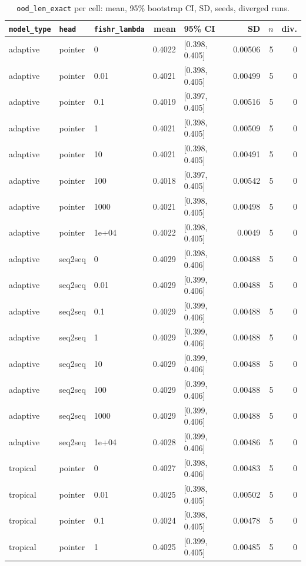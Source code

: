 \documentclass[10pt]{article}
\begin{document}
{\small
\begin{longtable}{lllrlrrr}
\caption{\texttt{ood\_len\_exact} per cell: mean, 95\% bootstrap CI, SD, seeds, diverged runs.}\label{tab:summary-ood_len_exact}\\
\toprule
\texttt{model\_type} & \texttt{head} & \texttt{fishr\_lambda} & mean & 95\% CI & SD & $n$ & div.\\
\midrule
\endhead
adaptive & pointer & 0 & 0.4022 & [0.398, 0.405] & 0.00506 & 5 & 0\\
adaptive & pointer & 0.01 & 0.4021 & [0.398, 0.405] & 0.00499 & 5 & 0\\
adaptive & pointer & 0.1 & 0.4019 & [0.397, 0.405] & 0.00516 & 5 & 0\\
adaptive & pointer & 1 & 0.4021 & [0.398, 0.405] & 0.00509 & 5 & 0\\
adaptive & pointer & 10 & 0.4021 & [0.398, 0.405] & 0.00491 & 5 & 0\\
adaptive & pointer & 100 & 0.4018 & [0.397, 0.405] & 0.00542 & 5 & 0\\
adaptive & pointer & 1000 & 0.4021 & [0.398, 0.405] & 0.00498 & 5 & 0\\
adaptive & pointer & 1e+04 & 0.4022 & [0.398, 0.405] & 0.0049 & 5 & 0\\
adaptive & seq2seq & 0 & 0.4029 & [0.398, 0.406] & 0.00488 & 5 & 0\\
adaptive & seq2seq & 0.01 & 0.4029 & [0.399, 0.406] & 0.00488 & 5 & 0\\
adaptive & seq2seq & 0.1 & 0.4029 & [0.399, 0.406] & 0.00488 & 5 & 0\\
adaptive & seq2seq & 1 & 0.4029 & [0.399, 0.406] & 0.00488 & 5 & 0\\
adaptive & seq2seq & 10 & 0.4029 & [0.399, 0.406] & 0.00488 & 5 & 0\\
adaptive & seq2seq & 100 & 0.4029 & [0.399, 0.406] & 0.00488 & 5 & 0\\
adaptive & seq2seq & 1000 & 0.4029 & [0.399, 0.406] & 0.00488 & 5 & 0\\
adaptive & seq2seq & 1e+04 & 0.4028 & [0.399, 0.406] & 0.00486 & 5 & 0\\
tropical & pointer & 0 & 0.4027 & [0.398, 0.406] & 0.00483 & 5 & 0\\
tropical & pointer & 0.01 & 0.4025 & [0.398, 0.405] & 0.00502 & 5 & 0\\
tropical & pointer & 0.1 & 0.4024 & [0.398, 0.405] & 0.00478 & 5 & 0\\
tropical & pointer & 1 & 0.4025 & [0.399, 0.405] & 0.00485 & 5 & 0\\

\end{longtable}}
\end{document}

